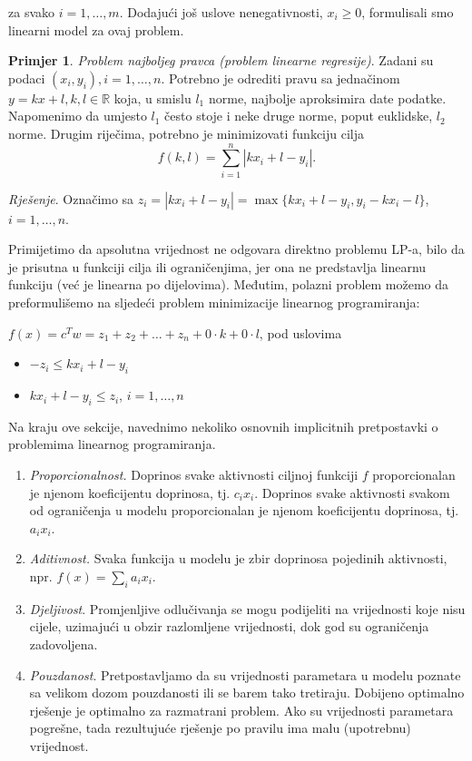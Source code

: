 \documentclass[a4paper, utf8, 11pt, colorlinks]{book}
\theoremstyle{definition}
\newtheorem{primjer}{Primjer}[chapter]
\begin{document}
 za svako $i=1,\ldots,m$. Dodajući još uslove nenegativnosti, $x_i \geq 0$, formulisali smo linearni model za ovaj problem.  
  \begin{primjer}
 \emph{Problem najboljeg pravca (problem linearne regresije)}. Zadani su podaci $(x_i, y_i), i = 1, \ldots , n$. Potrebno je odrediti pravu sa jednačinom $y = k x + l,
k, l \in \mathbb{R}$ koja, u smislu $l_1$ norme, najbolje aproksimira date podatke.  Napomenimo da umjesto $l_1$ često stoje i neke druge norme, poput euklidske, $l_2$ norme. Drugim riječima, potrebno je minimizovati  funkciju cilja $$f(k, l) = \sum_{i=1}^n |k x_i + l - y_i|.$$
 \end{primjer}

\emph{Rješenje}.
Označimo sa $z_i = |k x_i + l - y_i| = \max\{k x_i + l - y_i, y_i - k x_i - l \}$, $i=1,\ldots,n$. 


Primijetimo da apsolutna vrijednost ne odgovara direktno problemu LP-a, bilo da je prisutna u funkciji cilja ili ograničenjima, jer ona ne predstavlja linearnu funkciju (već je  linearna po dijelovima). Međutim, polazni problem možemo da preformulišemo na sljedeći  problem minimizacije linearnog programiranja: %

$f(x) = c^T w = z_1 + z_2 + \ldots + z_n + 0\cdot k + 0 \cdot l$, pod uslovima
\begin{itemize}
    \item $ -z_i \leq k x_i + l - y_i$ 
    \item $ k x_i + l - y_i \leq z_i $, $i=1, \ldots, n$
\end{itemize}


 
Na kraju ove sekcije, navednimo nekoliko osnovnih implicitnih pretpostavki o problemima linearnog programiranja. 
\begin{enumerate} 
    \item \emph{Proporcionalnost.} Doprinos svake aktivnosti ciljnoj funkciji $f$ proporcionalan je njenom koeficijentu doprinosa, tj. $c_ix_i$. Doprinos svake aktivnosti svakom od  ograničenja u modelu proporcionalan je njenom  koeficijentu doprinosa, tj. $a_ix_i$.
    \item  \emph{Aditivnost.} Svaka funkcija u modelu je zbir  doprinosa pojedinih aktivnosti, npr. $f(x) = \sum_i a_i x_i$.
    \item \emph{Djeljivost}. Promjenljive odlučivanja se mogu podijeliti na vrijednosti koje nisu cijele, uzimajući u obzir  razlomljene vrijednosti, dok god su ograničenja zadovoljena.  

    \item \emph{Pouzdanost}. Pretpostavljamo da su vrijednosti parametara u modelu poznate
    sa velikom dozom pouzdanosti ili se barem tako tretiraju. Dobijeno optimalno rješenje je optimalno za razmatrani problem. Ako su vrijednosti parametara pogrešne, tada rezultujuće rješenje po pravilu ima malu (upotrebnu)  vrijednost.  
\end{enumerate}
\end{document}
